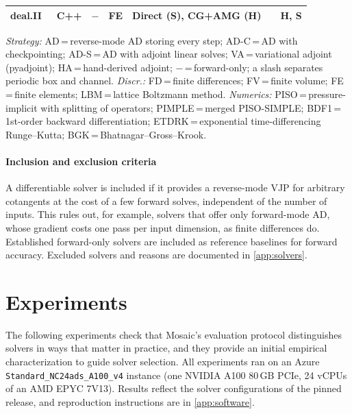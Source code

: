 \begin{table}[t]
{\begin{tabular}{@{}llllll c@{}}
    deal.II~\cite{bangerth2007dealii,arndt2023dealii}
      & C++ & $-$ & FE & Direct (S), CG+AMG (H) & & H, S \\
    \bottomrule
  \end{tabular}}
  \par\vspace{4pt}
  \begin{minipage}{\linewidth}\footnotesize\raggedright
    \textit{Strategy:}
    AD\,=\,reverse-mode AD storing every step;
    AD-C\,=\,AD with checkpointing;
    AD-S\,=\,AD with adjoint linear solves;
    VA\,=\,variational adjoint (pyadjoint);
    HA\,=\,hand-derived adjoint;
    $-$\,=\,forward-only;
    a slash separates periodic box and channel.
    \textit{Discr.:}
    FD\,=\,finite differences;
    FV\,=\,finite volume;
    FE\,=\,finite elements;
    LBM\,=\,lattice Boltzmann method.
    \textit{Numerics:}
    PISO\,=\,pressure-implicit with splitting of operators;
    PIMPLE\,=\,merged PISO-SIMPLE;
    BDF1\,=\,1st-order backward differentiation;
    ETDRK\,=\,exponential time-differencing Runge--Kutta;
    BGK\,=\,Bhatnagar--Gross--Krook.
  \end{minipage}
\end{table}

\paragraph{Inclusion and exclusion criteria}
A differentiable solver is included if it provides a reverse-mode VJP for
arbitrary cotangents at the cost of a few forward solves, independent of
the number of inputs. This rules out, for example, solvers that offer only
forward-mode AD, whose gradient costs one pass per input dimension, as
finite differences do. Established forward-only solvers are included as
reference baselines for forward accuracy. Excluded solvers and reasons are
documented in \cref{app:solvers}.

\section{Experiments}
\label{sec:experiments}

The following experiments check that Mosaic's evaluation protocol
distinguishes solvers in ways that matter in practice, and they provide an
initial empirical characterization to guide solver selection.
All experiments ran on an Azure \texttt{Standard\_NC24ads\_A100\_v4} instance
(one NVIDIA A100 80\,GB PCIe, 24 vCPUs of an AMD EPYC 7V13).
Results reflect the solver configurations of the pinned
release, and reproduction instructions are in \cref{app:software}.

